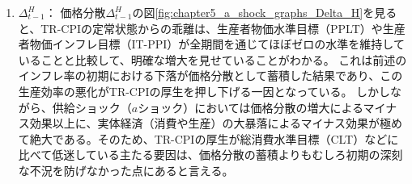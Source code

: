 \begin{enumerate}
        総消費水準目標（CLT）が初期に大きなプラス方向へのスパイクを記録しているのや、生産者物価インフレ目標（IT-PPI）が全期間を通じてゼロ近傍で極めて平坦な推移を維持しているのとは対照的である。
        テイラールールに従って消費者物価の変動に機械的な金融引き締めで対応してしまうため、実体経済を過度に冷やし込み、結果として国内生産財のインフレ率の落ち込みを招いている。この初期におけるインフレ率の変動が次項で述べる価格分散の蓄積をもたらし、結果として厚生を悪化させる一因となっている。
    \item
    \label{itm:chapter5_a_shock_policies_tr_cpi_Delta_t_minus_1_H}
        \(\Delta_{t-1}^H\)：
        価格分散\(\Delta_{t-1}^H\)の図\ref{fig:chapter5_a_shock_graphs_Delta_H}を見ると、TR-CPIの定常状態からの乖離は、生産者物価水準目標（PPLT）や生産者物価インフレ目標（IT-PPI）が全期間を通じてほぼゼロの水準を維持していることと比較して、明確な増大を見せていることがわかる。
        これは前述のインフレ率の初期における下落が価格分散として蓄積した結果であり、この生産効率の悪化がTR-CPIの厚生を押し下げる一因となっている。
        しかしながら、供給ショック（\(a\)ショック）においては価格分散の増大によるマイナス効果以上に、実体経済（消費や生産）の大暴落によるマイナス効果が極めて絶大である。そのため、TR-CPIの厚生が総消費水準目標（CLT）などに比べて低迷している主たる要因は、価格分散の蓄積よりもむしろ初期の深刻な不況を防げなかった点にあると言える。
\end{enumerate}